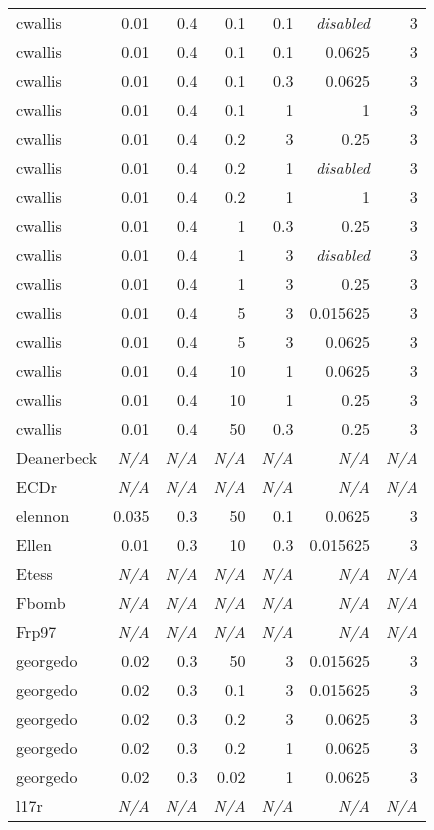 \begin{figure}[h]
\begin{tabular}{l|r|r|r|r|r|r}
cwallis & 0.01 & 0.4 & 0.1 & 0.1 & \emph{disabled} & 3 \\
cwallis & 0.01 & 0.4 & 0.1 & 0.1 & 0.0625 & 3 \\
cwallis & 0.01 & 0.4 & 0.1 & 0.3 & 0.0625 & 3 \\
cwallis & 0.01 & 0.4 & 0.1 & 1 & 1 & 3 \\
cwallis & 0.01 & 0.4 & 0.2 & 3 & 0.25 & 3 \\
cwallis & 0.01 & 0.4 & 0.2 & 1 & \emph{disabled} & 3 \\
cwallis & 0.01 & 0.4 & 0.2 & 1 & 1 & 3 \\
cwallis & 0.01 & 0.4 & 1 & 0.3 & 0.25 & 3 \\
cwallis & 0.01 & 0.4 & 1 & 3 & \emph{disabled} & 3 \\
cwallis & 0.01 & 0.4 & 1 & 3 & 0.25 & 3 \\
cwallis & 0.01 & 0.4 & 5 & 3 & 0.015625 & 3 \\
cwallis & 0.01 & 0.4 & 5 & 3 & 0.0625 & 3 \\
cwallis & 0.01 & 0.4 & 10 & 1 & 0.0625 & 3 \\
cwallis & 0.01 & 0.4 & 10 & 1 & 0.25 & 3 \\
cwallis & 0.01 & 0.4 & 50 & 0.3 & 0.25 & 3 \\
Deanerbeck & \emph{N/A} & \emph{N/A} & \emph{N/A} & \emph{N/A} & \emph{N/A} & \emph{N/A} \\
ECDr & \emph{N/A} & \emph{N/A} & \emph{N/A} & \emph{N/A} & \emph{N/A} & \emph{N/A} \\
elennon & 0.035 & 0.3 & 50 & 0.1 & 0.0625 & 3 \\
Ellen & 0.01 & 0.3 & 10 & 0.3 & 0.015625 & 3 \\
Etess & \emph{N/A} & \emph{N/A} & \emph{N/A} & \emph{N/A} & \emph{N/A} & \emph{N/A} \\
Fbomb & \emph{N/A} & \emph{N/A} & \emph{N/A} & \emph{N/A} & \emph{N/A} & \emph{N/A} \\
Frp97 & \emph{N/A} & \emph{N/A} & \emph{N/A} & \emph{N/A} & \emph{N/A} & \emph{N/A} \\
georgedo & 0.02 & 0.3 & 50 & 3 & 0.015625 & 3 \\
georgedo & 0.02 & 0.3 & 0.1 & 3 & 0.015625 & 3 \\
georgedo & 0.02 & 0.3 & 0.2 & 3 & 0.0625 & 3 \\
georgedo & 0.02 & 0.3 & 0.2 & 1 & 0.0625 & 3 \\
georgedo & 0.02 & 0.3 & 0.02 & 1 & 0.0625 & 3 \\
l17r & \emph{N/A} & \emph{N/A} & \emph{N/A} & \emph{N/A} & \emph{N/A} & \emph{N/A} \\

\end{tabular}
\end{figure}
